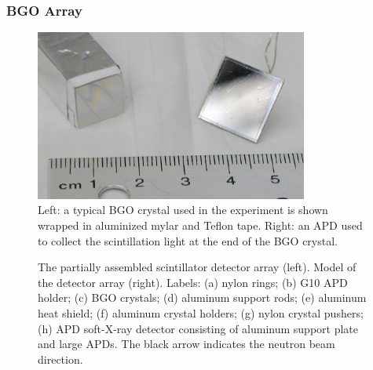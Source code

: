 \documentclass[oneside,12pt]{memoir}
\begin{document}
\subsubsection{BGO Array}
\label{sec:scint}
\begin{figure}[t]
	\centering
	\includegraphics[width=0.8\textwidth]{bgo1.png}
	\caption[BGO scintillator and APD]{Left: a typical BGO crystal used in the experiment is shown wrapped in aluminized mylar and Teflon tape. Right: an APD used to collect the scintillation light at the end of the BGO crystal.}
	\label{fig:bgo1}
\end{figure}
\begin{figure}[t]
	\centering
	\caption[Scintillator detector array]{The partially assembled scintillator detector array (left). Model of the detector array (right). Labels: (a) nylon rings; (b) G10 APD holder; (c) BGO crystals; (d) aluminum support rods; (e) aluminum heat shield; (f) aluminum crystal holders; (g) nylon crystal pushers; (h) APD soft-X-ray detector consisting of aluminum support plate and large APDs. The black arrow indicates the neutron beam direction.}
	\label{fig:bgo}
\end{figure}
\end{document}

